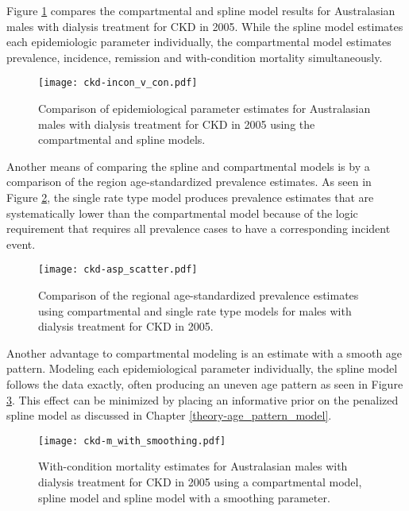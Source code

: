 Figure \ref{fig:app-CKD incon v con} compares the compartmental and
spline model results for Australasian males with dialysis
treatment for CKD in 2005.  While the spline model estimates each
epidemiologic parameter individually, the compartmental model estimates
prevalence, incidence, remission and with-condition mortality
simultaneously.

    \begin{figure}[h]
        \begin{center}
            \texttt{[image: ckd-incon\_v\_con.pdf]}
            \caption{Comparison of epidemiological parameter estimates
              for Australasian males with dialysis treatment for CKD
              in 2005 using the compartmental and spline
              models.}
            \label{fig:app-CKD incon v con}
        \end{center}
    \end{figure}

Another means of comparing the spline and compartmental
models is by a comparison of the region age-standardized prevalence
estimates.  As seen in Figure \ref{fig:app-CKD asp}, the single rate
type model produces prevalence estimates that are systematically lower
than the compartmental model because of the logic requirement that
requires all prevalence cases to have a corresponding incident event.

    \begin{figure}[h]
        \begin{center}
            \texttt{[image: ckd-asp\_scatter.pdf]}
            \caption{Comparison of the regional age-standardized
              prevalence estimates using compartmental and single rate
              type models for males with dialysis treatment for CKD in
              2005.}
            \label{fig:app-CKD asp}
        \end{center}
    \end{figure}

Another advantage to compartmental modeling is an estimate with a smooth
age pattern. Modeling each epidemiological parameter individually, the
spline model follows the data exactly, often producing an
uneven age pattern as seen in Figure \ref{fig:app-CKD smooth}.  This
effect can be minimized by placing an informative prior on the
penalized spline model as discussed in Chapter
\ref{theory-age_pattern_model}.

    \begin{figure}[h]
        \begin{center}
            \texttt{[image: ckd-m\_with\_smoothing.pdf]}
            \caption{With-condition mortality estimates for
              Australasian males with dialysis treatment for CKD in
              2005 using a compartmental model, spline model
              and spline model with a smoothing parameter.}
            \label{fig:app-CKD smooth}
        \end{center}
    \end{figure}


